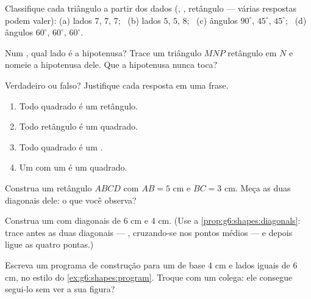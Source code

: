 \begin{exercise}[$\star$]\label{exo:g6:shapes:4}
Classifique cada triângulo a partir dos dados (, ,
retângulo --- várias respostas podem valer):
(a) lados $7$, $7$, $7$; \
(b) lados $5$, $5$, $8$; \
(c) ângulos $90^\circ$, $45^\circ$, $45^\circ$; \
(d) ângulos $60^\circ$, $60^\circ$, $60^\circ$.
\end{exercise}

\begin{exercise}[$\star$]\label{exo:g6:shapes:5}
Num , qual lado é a hipotenusa? Trace um triângulo
$MNP$ retângulo em $N$ e nomeie a hipotenusa dele. Que  a
hipotenusa nunca toca?
\end{exercise}

\begin{exercise}[$\star$]\label{exo:g6:shapes:6}
Verdadeiro ou falso? Justifique cada resposta em uma frase.
\begin{enumerate}
  \item Todo quadrado é um retângulo.
  \item Todo retângulo é um quadrado.
  \item Todo quadrado é um .
  \item Um  com um  é um quadrado.
\end{enumerate}
\end{exercise}

\begin{exercise}[$\star$]\label{exo:g6:shapes:7}
Construa um retângulo $ABCD$ com $AB = 5$ cm e $BC = 3$ cm. Meça as
duas diagonais dele: o que você observa?
\end{exercise}

\begin{exercise}[$\star$]\label{exo:g6:shapes:8}
Construa um  com diagonais de $6$ cm e $4$ cm. (Use a
\cref{prop:g6:shapes:diagonals}: trace antes as duas diagonais ---
\omterm{def:g6:lines:perp}{perpendiculares}, cruzando-se nos pontos médios --- e depois ligue as
quatro pontas.)
\end{exercise}

\begin{exercise}[$\star\star$]\label{exo:g6:shapes:9}
Escreva um programa de construção para um  de base
$4$ cm e lados iguais de $6$ cm, no estilo do
\cref{ex:g6:shapes:program}. Troque com um colega: ele consegue
segui-lo sem ver a sua figura?
\end{exercise}

